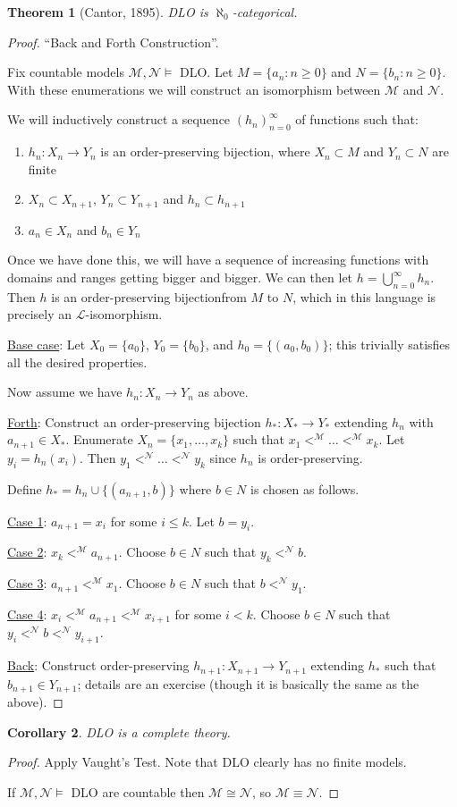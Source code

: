 \documentclass[]{article}
\theoremstyle{custhm}
\newtheorem{theorem}{Theorem}[section]
\theoremstyle{cusdef}
\theoremstyle{custhm}
\theoremstyle{custhm}
\newtheorem{cor}[theorem]{Corollary}
\theoremstyle{custhm}
\theoremstyle{ex}
\theoremstyle{custhm}
\theoremstyle{cusdef}
\theoremstyle{remark}
\theoremstyle{remark}
\newcommand{\ra}{\rightarrow}
\renewcommand{\L}{\mathcal{L}}
\newcommand{\M}{\mathcal{M}}
\newcommand{\N}{\mathcal{N}}
\begin{document}
\begin{theorem}[Cantor, 1895]
DLO is $\aleph_0$-categorical.
\end{theorem}
\begin{proof}
``Back and Forth Construction''.

Fix countable models $\M,\N\models$ DLO. Let $M = \{a_n:n\ge 0\}$ and $N = \{b_n:n\ge 0\}$. With these enumerations we will construct an isomorphism between $\M$ and $\N$.

We will inductively construct a sequence $(h_n)_{n=0}^{\infty}$ of functions such that:
\begin{enumerate}[label=\arabic*)]
	\item $h_n:X_n\ra Y_n$ is an order-preserving bijection, where $X_n\subset M$ and $Y_n\subset N$ are finite
	\item $X_n\subset X_{n+1}$, $Y_n\subset Y_{n+1}$ and $h_n\subset h_{n+1}$
	\item $a_n \in X_n$ and $b_n \in Y_n$
\end{enumerate}
Once we have done this, we will have a sequence of increasing functions with domains and ranges getting bigger and bigger. We can then let $h = \bigcup_{n=0}^{\infty}h_n$. Then $h$ is an order-preserving bijectionfrom $M$ to $N$, which in this language is precisely an $\L$-isomorphism.

\underline{Base case}: Let $X_0 = \{a_0\}$, $Y_0 = \{b_0\}$, and $h_0 = \{(a_0,b_0)\}$; this trivially satisfies all the desired properties.

Now assume we have $h_n:X_n\ra Y_n$ as above.

\underline{Forth}: Construct an order-preserving bijection $h_\ast:X_\ast\ra Y_\ast$ extending $h_n$ with $a_{n+1}\in X_\ast$. Enumerate $X_n = \{x_1,\dots,x_k\}$ such that $x_1 <^\M \dots <^\M x_k$. Let $y_i = h_n(x_i)$. Then $y_1 <^\N \dots <^\N y_k$ since $h_n$ is order-preserving.

Define $h_\ast = h_n \cup \{(a_{n+1},b)\}$ where $b\in N$ is chosen as follows.

\underline{Case 1}: $a_{n+1} = x_i$ for some $i\le k$. Let $b = y_i$.

\underline{Case 2}: $x_k <^\M a_{n+1}$. Choose $b\in N$ such that $y_k <^\N b$.

\underline{Case 3}: $a_{n+1} <^\M x_1$. Choose $b\in N$ such that $b <^\N y_1$.

\underline{Case 4}: $x_i <^\M a_{n+1} <^\M x_{i+1}$ for some $ i < k$. Choose $b \in N$ such that $y_i < ^\N b < ^\N y_{i+1}$.

\underline{Back}: Construct order-preserving $h_{n+1}:X_{n+1}\ra Y_{n+1}$ extending $h_\ast$ such that $b_{n+1}\in Y_{n+1}$; details are an exercise (though it is basically the same as the above).
\end{proof}
\begin{cor}
DLO is a complete theory.
\end{cor}
\begin{proof}
Apply Vaught's Test. Note that DLO clearly has no finite models.

If $\M,\N\models$ DLO are countable then $\M \cong \N$, so $\M \equiv \N$.
\end{proof}
\end{document}

